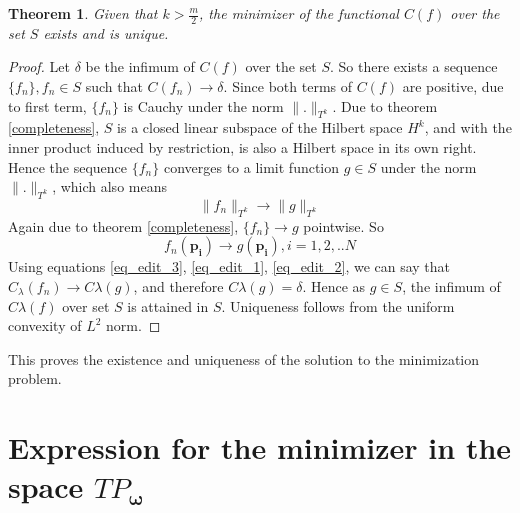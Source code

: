 \documentclass[multixcb]{amstext-l}
\theoremstyle{plain}
\newtheorem{theorem}{Theorem}[chapter]
\theoremstyle{definition}
\theoremstyle{definition}
\theoremstyle{remark}
\numberwithin{equation}{chapter}
\begin{document}
\begin{appendix}
\begin{theorem}
Given that $k>\frac{m}{2}$, the minimizer of the functional $C(f)$ over the set $S$ exists and is unique.
\end{theorem}

\begin{proof}
Let $\delta$ be the infimum of $C(f)$ over the set $S$. So there exists a sequence $\{f_n\}, f_n \in S$ such that $C(f_n) \to \delta$. Since both terms of $C(f)$ are positive, due to first term, $\{f_n\}$ is Cauchy under the norm $\|.\|_{T^k}$. Due to theorem \ref{completeness}, $S$ is a closed linear subspace of the Hilbert space $H^k$, and with the inner product induced by restriction, is also a Hilbert space in its own right. Hence the sequence $\{f_n\}$ converges to a limit function $g \in S$ under the norm $\|.\|_{T^k}$, which also means
\begin{equation}
\label{eq_edit_1}
\|f_n\|_{T^k} \to \|g\|_{T^k}
\end{equation}
Again due to theorem \ref{completeness}, $\{f_n\} \to g$ pointwise. So \begin{equation}
\label{eq_edit_2}
f_n(\boldsymbol{p_i}) \to g(\boldsymbol{p_i}), i = 1,2,..N
\end{equation}
Using equations \ref{eq_edit_3}, \ref{eq_edit_1}, \ref{eq_edit_2}, we can say that $C_{\lambda}(f_n)\to C{\lambda}(g)$, and therefore $C{\lambda}(g) = \delta$. Hence as $g \in S$, the infimum of $C{\lambda}(f)$ over set $S$ is attained in $S$. Uniqueness follows from the uniform convexity of $L^2$ norm.
\end{proof}
This proves the existence and uniqueness of the solution to the minimization problem.

\chapter{Expression for the minimizer in the space $TP_{\boldsymbol{\omega}}$}\label{A2}



\end{appendix}
\end{document}

